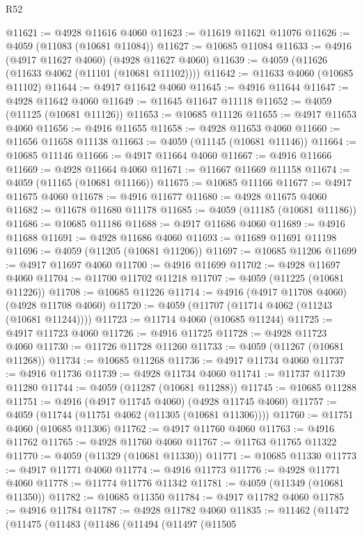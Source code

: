 \begin{lexlean}{R52}
\begin{coremodule}
@11621 := @4928 @11616 @4060
@11623 := @11619 @11621 @11076
@11626 := @4059 (@11083 (@10681 @11084))
@11627 := @10685 @11084
@11633 := @4916 (@4917 @11627 @4060) (@4928 @11627 @4060)
@11639 := @4059 (@11626 (@11633 @4062 (@11101 (@10681 @11102))))
@11642 := @11633 @4060 (@10685 @11102)
@11644 := @4917 @11642 @4060
@11645 := @4916 @11644
@11647 := @4928 @11642 @4060
@11649 := @11645 @11647 @11118
@11652 := @4059 (@11125 (@10681 @11126))
@11653 := @10685 @11126
@11655 := @4917 @11653 @4060
@11656 := @4916 @11655
@11658 := @4928 @11653 @4060
@11660 := @11656 @11658 @11138
@11663 := @4059 (@11145 (@10681 @11146))
@11664 := @10685 @11146
@11666 := @4917 @11664 @4060
@11667 := @4916 @11666
@11669 := @4928 @11664 @4060
@11671 := @11667 @11669 @11158
@11674 := @4059 (@11165 (@10681 @11166))
@11675 := @10685 @11166
@11677 := @4917 @11675 @4060
@11678 := @4916 @11677
@11680 := @4928 @11675 @4060
@11682 := @11678 @11680 @11178
@11685 := @4059 (@11185 (@10681 @11186))
@11686 := @10685 @11186
@11688 := @4917 @11686 @4060
@11689 := @4916 @11688
@11691 := @4928 @11686 @4060
@11693 := @11689 @11691 @11198
@11696 := @4059 (@11205 (@10681 @11206))
@11697 := @10685 @11206
@11699 := @4917 @11697 @4060
@11700 := @4916 @11699
@11702 := @4928 @11697 @4060
@11704 := @11700 @11702 @11218
@11707 := @4059 (@11225 (@10681 @11226))
@11708 := @10685 @11226
@11714 := @4916 (@4917 @11708 @4060) (@4928 @11708 @4060)
@11720 := @4059 (@11707 (@11714 @4062 (@11243 (@10681 @11244))))
@11723 := @11714 @4060 (@10685 @11244)
@11725 := @4917 @11723 @4060
@11726 := @4916 @11725
@11728 := @4928 @11723 @4060
@11730 := @11726 @11728 @11260
@11733 := @4059 (@11267 (@10681 @11268))
@11734 := @10685 @11268
@11736 := @4917 @11734 @4060
@11737 := @4916 @11736
@11739 := @4928 @11734 @4060
@11741 := @11737 @11739 @11280
@11744 := @4059 (@11287 (@10681 @11288))
@11745 := @10685 @11288
@11751 := @4916 (@4917 @11745 @4060) (@4928 @11745 @4060)
@11757 := @4059 (@11744 (@11751 @4062 (@11305 (@10681 @11306))))
@11760 := @11751 @4060 (@10685 @11306)
@11762 := @4917 @11760 @4060
@11763 := @4916 @11762
@11765 := @4928 @11760 @4060
@11767 := @11763 @11765 @11322
@11770 := @4059 (@11329 (@10681 @11330))
@11771 := @10685 @11330
@11773 := @4917 @11771 @4060
@11774 := @4916 @11773
@11776 := @4928 @11771 @4060
@11778 := @11774 @11776 @11342
@11781 := @4059 (@11349 (@10681 @11350))
@11782 := @10685 @11350
@11784 := @4917 @11782 @4060
@11785 := @4916 @11784
@11787 := @4928 @11782 @4060
@11835 := @11462
    (@11472
      (@11475
        (@11483
          (@11486
            (@11494
              (@11497
                (@11505

\end{coremodule}
\end{lexlean}

